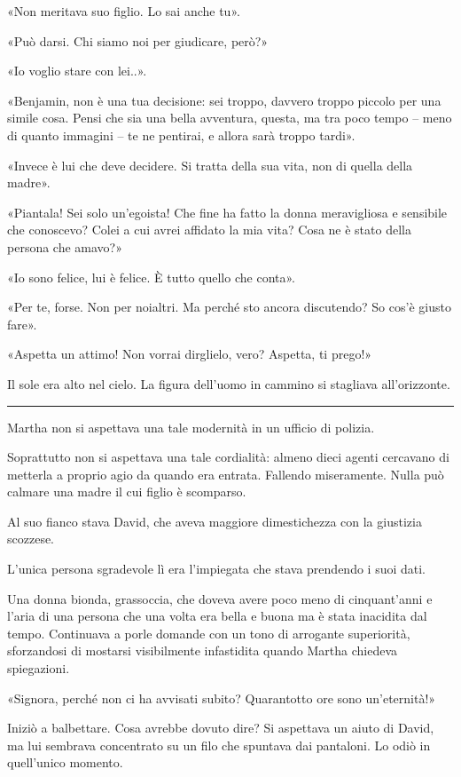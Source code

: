 \documentclass[a4paper,11pt,oneside,openright,final]{memoir}
\begin{document}
«Non meritava suo figlio. Lo sai anche tu».

«Può darsi. Chi siamo noi per giudicare, però?»

«Io voglio stare con lei..».

«Benjamin, non è una tua decisione: sei troppo, davvero troppo piccolo per una
simile cosa. Pensi che sia una bella avventura, questa, ma tra poco tempo --
meno di quanto immagini -- te ne pentirai, e allora sarà troppo tardi».

«Invece è lui che deve decidere. Si tratta della sua vita, non di quella della
madre».

«Piantala! Sei solo un'egoista! Che fine ha fatto la donna meravigliosa e
sensibile che conoscevo? Colei a cui avrei affidato la mia vita? Cosa ne è
stato della persona che amavo?»

«Io sono felice, lui è felice. È tutto quello che conta».

«Per te, forse. Non per noialtri. Ma perché sto ancora discutendo? So cos'è
giusto fare».

«Aspetta un attimo! Non vorrai dirglielo, vero? Aspetta, ti prego!»

Il sole era alto nel cielo. La figura dell'uomo in cammino si stagliava
all'orizzonte.

\plainbreak{1}

Martha non si aspettava una tale modernità in un ufficio di polizia.

Soprattutto non si aspettava una tale cordialità: almeno dieci agenti cercavano
di metterla a proprio agio da quando era entrata. Fallendo miseramente. Nulla
può calmare una madre il cui figlio è scomparso.

Al suo fianco stava David, che aveva maggiore dimestichezza con la giustizia
scozzese.

L'unica persona sgradevole lì era l'impiegata che stava prendendo i suoi dati.

Una donna bionda, grassoccia, che doveva avere poco meno di cinquant'anni e
l'aria di una persona che una volta era bella e buona ma è stata inacidita dal
tempo. Continuava a porle domande con un tono di arrogante superiorità,
sforzandosi di mostarsi visibilmente infastidita quando Martha chiedeva
spiegazioni.

«Signora, perché non ci ha avvisati subito? Quarantotto ore sono
un'eternità!»

Iniziò a balbettare. Cosa avrebbe dovuto dire? Si aspettava un aiuto di David,
ma lui sembrava concentrato su un filo che spuntava dai pantaloni. Lo odiò in
quell'unico momento.
\end{document}
